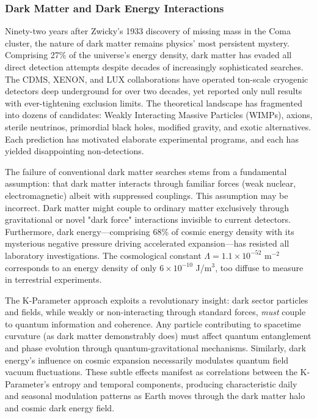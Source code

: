 \documentclass[11pt,a4paper,twoside]{article}
\begin{document}
\subsubsection*{Dark Matter and Dark Energy Interactions}

Ninety-two years after Zwicky's 1933 discovery of missing mass in the Coma cluster, the nature of dark matter remains physics' most persistent mystery. Comprising 27\% of the universe's energy density, dark matter has evaded all direct detection attempts despite decades of increasingly sophisticated searches. The CDMS, XENON, and LUX collaborations have operated ton-scale cryogenic detectors deep underground for over two decades, yet reported only null results with ever-tightening exclusion limits. The theoretical landscape has fragmented into dozens of candidates: Weakly Interacting Massive Particles (WIMPs), axions, sterile neutrinos, primordial black holes, modified gravity, and exotic alternatives. Each prediction has motivated elaborate experimental programs, and each has yielded disappointing non-detections.

The failure of conventional dark matter searches stems from a fundamental assumption: that dark matter interacts through familiar forces (weak nuclear, electromagnetic) albeit with suppressed couplings. This assumption may be incorrect. Dark matter might couple to ordinary matter exclusively through gravitational or novel "dark force" interactions invisible to current detectors. Furthermore, dark energy---comprising 68\% of cosmic energy density with its mysterious negative pressure driving accelerated expansion---has resisted all laboratory investigations. The cosmological constant $\Lambda = 1.1 \times 10^{-52}$ m$^{-2}$ corresponds to an energy density of only $6 \times 10^{-10}$ J/m$^3$, too diffuse to measure in terrestrial experiments.

The K-Parameter approach exploits a revolutionary insight: dark sector particles and fields, while weakly or non-interacting through standard forces, \textit{must} couple to quantum information and coherence. Any particle contributing to spacetime curvature (as dark matter demonstrably does) must affect quantum entanglement and phase evolution through quantum-gravitational mechanisms. Similarly, dark energy's influence on cosmic expansion necessarily modulates quantum field vacuum fluctuations. These subtle effects manifest as correlations between the K-Parameter's entropy and temporal components, producing characteristic daily and seasonal modulation patterns as Earth moves through the dark matter halo and cosmic dark energy field.
\end{document}
